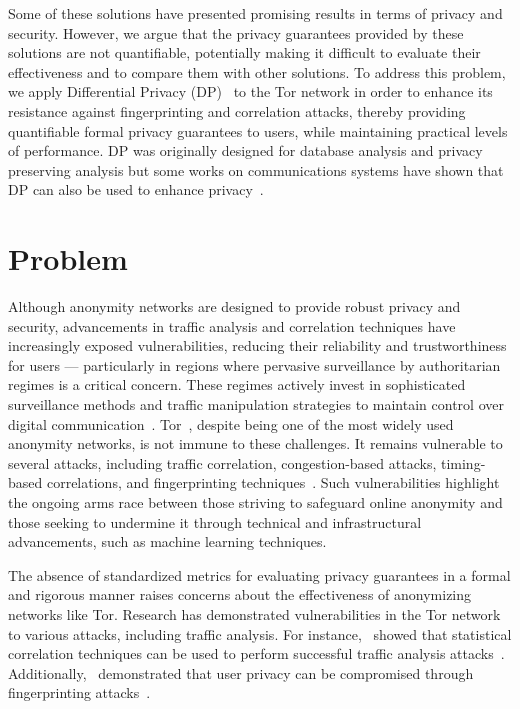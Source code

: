 Some of these solutions have presented promising results in terms of privacy and security. However, we argue that the privacy guarantees provided by these solutions are not quantifiable, potentially making it difficult to evaluate their effectiveness and to compare them with other solutions. To address this problem, we apply Differential Privacy (DP)~\cite*{DifPrivacy,DifPrivacyCalNoise,DP_Book} to the Tor network in order to enhance its resistance against fingerprinting and correlation attacks, thereby providing quantifiable formal privacy guarantees to users, while maintaining practical levels of performance. DP was originally designed for database analysis and privacy preserving analysis but some works on communications systems have shown that DP can also be used to enhance privacy~\cite*{Loopix, Stadium, VilalongaINForum, StatPrivStreaming, NetShaper}. 


\section{Problem}\label{sec:problem}
Although anonymity networks are designed to provide robust privacy and security, advancements in traffic analysis and correlation techniques have increasingly exposed vulnerabilities, reducing their reliability and trustworthiness for users — particularly in regions where pervasive surveillance by authoritarian regimes is a critical concern. These regimes actively invest in sophisticated surveillance methods and traffic manipulation strategies to maintain control over digital communication~\cite*{aryan2013internet, zittrain2017shifting, alimardani2018internet}.
Tor~\cite{dingledine2004tor}, despite being one of the most widely used anonymity networks, is not immune to these challenges. It remains vulnerable to several attacks, including traffic correlation, congestion-based attacks, timing-based correlations, and fingerprinting techniques~\cite*{chakravarty2014trafficanalysis, johnson2013users,winter2012great, robjansen2019dosontor}. Such vulnerabilities highlight the ongoing arms race between those striving to safeguard online anonymity and those seeking to undermine it through technical and infrastructural advancements, such as machine learning techniques.

The absence of standardized metrics for evaluating privacy guarantees in a formal and rigorous manner raises concerns about the effectiveness of anonymizing networks like Tor. Research has demonstrated vulnerabilities in the Tor network to various attacks, including traffic analysis. For instance,~\citeauthor{chakravarty2014trafficanalysis} showed that statistical correlation techniques can be used to perform successful traffic analysis attacks~\cite{chakravarty2014trafficanalysis}. Additionally,~\citeauthor{yi2009fingerprinting} demonstrated that user privacy can be compromised through fingerprinting attacks~\cite{yi2009fingerprinting}.

